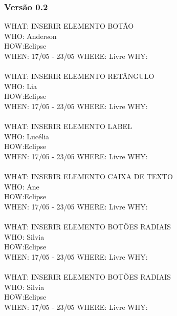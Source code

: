 \documentclass[12pt,a4paper]{article}
\begin{document}
\subsubsection*{Versão 0.2}
WHAT: INSERIR ELEMENTO BOTÃO\\
WHO: Anderson\\
HOW:Eclipse \\
WHEN: 17/05 - 23/05  WHERE: Livre  WHY:\\
\\
WHAT: INSERIR ELEMENTO RETÂNGULO\\
WHO: Lia\\
HOW:Eclipse\\ 
WHEN: 17/05 - 23/05  WHERE: Livre  WHY:\\
\\
WHAT: INSERIR ELEMENTO LABEL\\
WHO: Lucélia\\
HOW:Eclipse \\
WHEN: 17/05 - 23/05  WHERE: Livre  WHY:\\
\\
WHAT: INSERIR ELEMENTO CAIXA DE TEXTO\\
WHO: Ane\\
HOW:Eclipse\\ 
WHEN: 17/05 - 23/05  WHERE: Livre  WHY:\\
\\
WHAT: INSERIR ELEMENTO BOTÕES RADIAIS\\
WHO: Silvia\\
HOW:Eclipse \\
WHEN: 17/05 - 23/05  WHERE: Livre  WHY:\\
\\
WHAT: INSERIR ELEMENTO BOTÕES RADIAIS\\
WHO: Silvia\\
HOW:Eclipse\\
WHEN: 17/05 - 23/05  WHERE: Livre  WHY:\\
\end{document}
